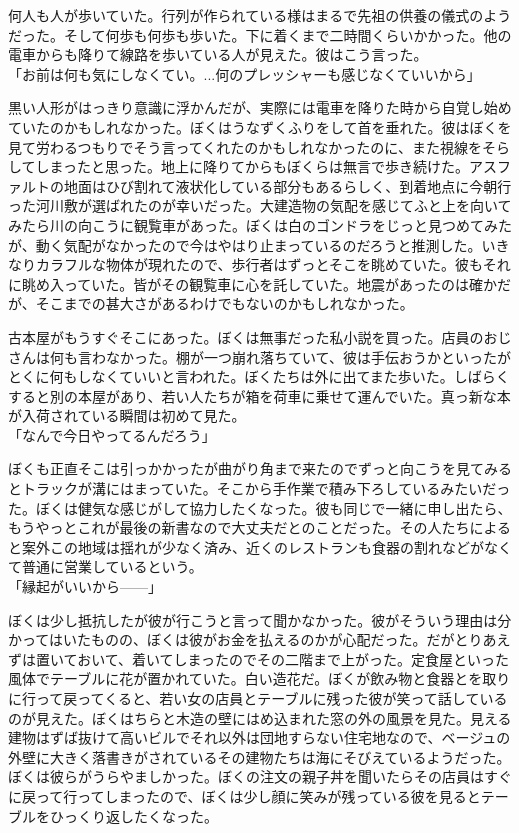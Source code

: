 \documentclass[b5j,twoside,twocolumn]{utarticle}
\begin{document}
何人も人が歩いていた。行列が作られている様はまるで先祖の供養の儀式のようだった。そして何歩も何歩も歩いた。下に着くまで二時間くらいかかった。他の電車からも降りて線路を歩いている人が見えた。彼はこう言った。\\
「お前は何も気にしなくてい。...何のプレッシャーも感じなくていいから」


黒い人形がはっきり意識に浮かんだが、実際には電車を降りた時から自覚し始めていたのかもしれなかった。ぼくはうなずくふりをして首を垂れた。彼はぼくを見て労わるつもりでそう言ってくれたのかもしれなかったのに、また視線をそらしてしまったと思った。地上に降りてからもぼくらは無言で歩き続けた。アスファルトの地面はひび割れて液状化している部分もあるらしく、到着地点に今朝行った河川敷が選ばれたのが幸いだった。大建造物の気配を感じてふと上を向いてみたら川の向こうに観覧車があった。ぼくは白のゴンドラをじっと見つめてみたが、動く気配がなかったので今はやはり止まっているのだろうと推測した。いきなりカラフルな物体が現れたので、歩行者はずっとそこを眺めていた。彼もそれに眺め入っていた。皆がその観覧車に心を託していた。地震があったのは確かだが、そこまでの甚大さがあるわけでもないのかもしれなかった。


古本屋がもうすぐそこにあった。ぼくは無事だった私小説を買った。店員のおじさんは何も言わなかった。棚が一つ崩れ落ちていて、彼は手伝おうかといったがとくに何もしなくていいと言われた。ぼくたちは外に出てまた歩いた。しばらくすると別の本屋があり、若い人たちが箱を荷車に乗せて運んでいた。真っ新な本が入荷されている瞬間は初めて見た。\\
「なんで今日やってるんだろう」


ぼくも正直そこは引っかかったが曲がり角まで来たのでずっと向こうを見てみるとトラックが溝にはまっていた。そこから手作業で積み下ろしているみたいだった。ぼくは健気な感じがして協力したくなった。彼も同じで一緒に申し出たら、もうやっとこれが最後の新書なので大丈夫だとのことだった。その人たちによると案外この地域は揺れが少なく済み、近くのレストランも食器の割れなどがなくて普通に営業しているという。\\
「縁起がいいから\tbaselineshift=2.5pt------\tbaselineshift=4.0pt」


ぼくは少し抵抗したが彼が行こうと言って聞かなかった。彼がそういう理由は分かってはいたものの、ぼくは彼がお金を払えるのかが心配だった。だがとりあえずは置いておいて、着いてしまったのでその二階まで上がった。定食屋といった風体でテーブルに花が置かれていた。白い造花だ。ぼくが飲み物と食器とを取りに行って戻ってくると、若い女の店員とテーブルに残った彼が笑って話しているのが見えた。ぼくはちらと木造の壁にはめ込まれた窓の外の風景を見た。見える建物はずば抜けて高いビルでそれ以外は団地すらない住宅地なので、ベージュの外壁に大きく落書きがされているその建物たちは海にそびえているようだった。ぼくは彼らがうらやましかった。ぼくの注文の親子丼を聞いたらその店員はすぐに戻って行ってしまったので、ぼくは少し顔に笑みが残っている彼を見るとテーブルをひっくり返したくなった。
\end{document}
